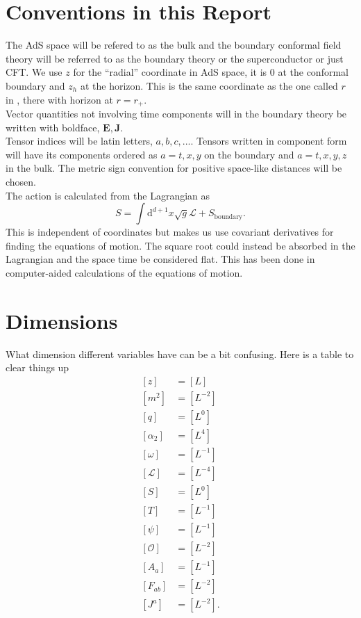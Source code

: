 \documentclass[12pt]{report}
\renewcommand{\d}{\ensuremath{\mathrm{d}}}
\renewcommand{\L}{\ensuremath{\mathcal{L}}}
\begin{document}
\begin{appendices}
\chapter{Conventions in this Report\label{conventions}}
The AdS space will be refered to as the bulk and the boundary conformal field theory will be referred to as the boundary theory or the superconductor or just CFT. We use $z$ for the ``radial'' coordinate in AdS space, it is 0 at the conformal boundary and $z_h$ at the horizon. This is the same coordinate as the one called $r$ in \cite{hartnoll8}, there with horizon at $r=r_+$.\\
Vector quantities not involving time components will in the boundary theory be written with boldface, $\mathbf{E}, \mathbf{J}$.\\
Tensor indices will be latin letters, $a,b,c,...$. Tensors written in component form will have its components ordered as $a=t,x,y$ on the boundary and $a=t,x,y,z$ in the bulk.
The metric sign convention for positive space-like distances will be chosen.\\
The action is calculated from the Lagrangian as
\begin{equation}
 S=\int\d^{d+1} x\sqrt{g}\L+S_\mathrm{boundary}.
\end{equation}
This is independent of coordinates but makes us use covariant derivatives for finding the equations of motion. The square root could instead be absorbed in the Lagrangian and the space time be considered flat. This has been done in computer-aided calculations of the equations of motion.
\chapter{Dimensions}
What dimension different variables have can be a bit confusing. Here is a table to clear things up
\begin{equation}
 \begin{split}
[z]&=[L]\\
[m^2]&=[L^{-2}]\\
[q]&=[L^{0}]\\
[\alpha_2]&=[L^{4}]\\
[\omega]&=[L^{-1}]\\
[\mathcal{L}]&=[L^{-4}]\\
[S]&=[L^0]\\
[T]&=[L^{-1}]\\
[\psi]&=[L^{-1}]\\
[\mathcal{O}]&=[L^{-2}]\\
[A_a]&=[L^{-1}]\\
[F_{ab}]&=[L^{-2}]\\
[J^a]&=[L^{-2}].
 \end{split}
\end{equation}



\end{appendices}
\end{document}
